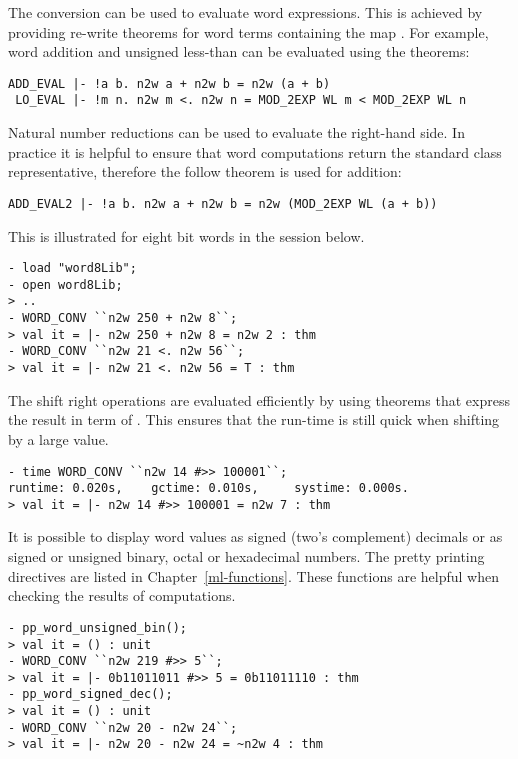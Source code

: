 The conversion  can be used to evaluate word expressions.  This is achieved by providing re-write theorems for word terms containing the map .  For example, word addition and unsigned less-than can be evaluated using the theorems:

\begin{hol}\begin{verbatim}
ADD_EVAL |- !a b. n2w a + n2w b = n2w (a + b)
 LO_EVAL |- !m n. n2w m <. n2w n = MOD_2EXP WL m < MOD_2EXP WL n
\end{verbatim}\end{hol}

\noindent Natural number reductions can be used to evaluate the right-hand side.  In practice it is helpful to ensure that word computations return the standard class representative, therefore the follow theorem is used for addition:

\begin{hol}\begin{verbatim}
ADD_EVAL2 |- !a b. n2w a + n2w b = n2w (MOD_2EXP WL (a + b))
\end{verbatim}\end{hol}

\noindent This is illustrated for eight bit words in the session below.

\setcounter{sessioncount}{0}
\begin{session}\begin{verbatim}
- load "word8Lib";
- open word8Lib;
> ..
- WORD_CONV ``n2w 250 + n2w 8``;
> val it = |- n2w 250 + n2w 8 = n2w 2 : thm
- WORD_CONV ``n2w 21 <. n2w 56``;
> val it = |- n2w 21 <. n2w 56 = T : thm
\end{verbatim}\end{session}

The shift right operations are evaluated efficiently by using theorems that express the result in term of .  This ensures that the run-time is still quick when shifting by a large value.

\begin{session}\begin{verbatim}
- time WORD_CONV ``n2w 14 #>> 100001``;
runtime: 0.020s,    gctime: 0.010s,     systime: 0.000s.
> val it = |- n2w 14 #>> 100001 = n2w 7 : thm
\end{verbatim}\end{session}

It is possible to display word values as signed (two's complement) decimals or as signed or unsigned binary, octal or hexadecimal numbers.  The pretty printing directives are listed in Chapter~\ref{ml-functions}.  These functions are helpful when checking the results of computations.
\begin{session}\begin{verbatim}
- pp_word_unsigned_bin();
> val it = () : unit
- WORD_CONV ``n2w 219 #>> 5``;
> val it = |- 0b11011011 #>> 5 = 0b11011110 : thm
- pp_word_signed_dec();
> val it = () : unit
- WORD_CONV ``n2w 20 - n2w 24``;
> val it = |- n2w 20 - n2w 24 = ~n2w 4 : thm
\end{verbatim}\end{session}

